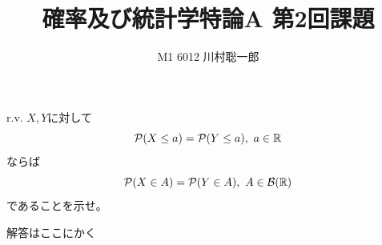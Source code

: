 \documentclass[dvipdfmx]{jsreport}
\title{確率及び統計学特論A 第2回課題}
\author{M1 6012 川村聡一郎}
\date{}
\begin{document}
\maketitle

\begin{tcolorbox}
	r.v. $X, Y$に対して
\begin{equation*}
	\mathcal{P}(X\le a)= \mathcal{P}(Y\le a),\ a\in \R
\end{equation*}
	ならば
\begin{equation*}
	\mathcal{P}(X\in A)= \mathcal{P}(Y\in A),\ A\in \mathcal{B}(\mathbb{R})
\end{equation*}
	であることを示せ。
\end{tcolorbox}


\begin{souanswer} %
	解答はここにかく
\end{souanswer}
\end{document}
